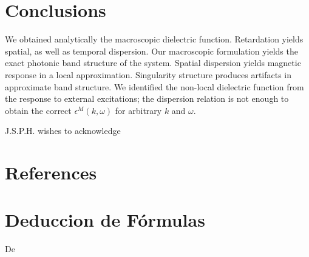 \documentclass{iopart}
\begin{document}
\section{Conclusions}
\label{conclusion}
 We obtained analytically the macroscopic dielectric function.
 Retardation yields spatial, as well as temporal dispersion.
 Our macroscopic formulation yields the exact photonic band
  structure of the system.
 Spatial dispersion yields magnetic response in a local
  approximation.
 Singularity structure produces artifacts in approximate band structure. 
 We identified the non-local dielectric function from the response
  to external excitations; the dispersion relation \cite{Elser07}
  is not enough to obtain the correct $\epsilon^M(k,\omega)$ for
  arbitrary  $k$ and $\omega$. 







\ack J.S.P.H. wishes to acknowledge
\section*{References} 

\appendix 

\section{Deduccion de Fórmulas}
\label{AppendixA}
De
\end{document}
